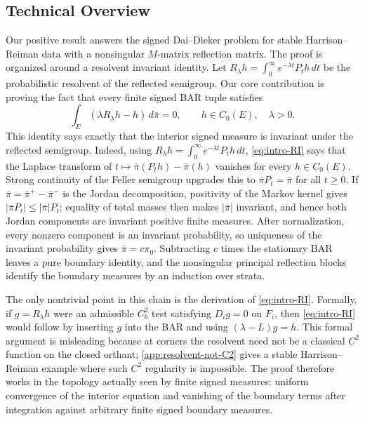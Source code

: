 \documentclass[aihp]{imsart}
\numberwithin{equation}{section}
\theoremstyle{plain}
\theoremstyle{definition}
\newcommand{\1}{\mathbf 1}
\begin{document}
\subsection*{Technical Overview}

Our positive result answers the signed Dai--Dieker problem for stable Harrison--Reiman data with a nonsingular $M$-matrix reflection matrix.  The proof is organized around a resolvent invariant identity.  Let $R_\lambda h=\int_0^\infty e^{-\lambda t}P_t h\,dt$ be the probabilistic resolvent of the reflected semigroup.  Our core contribution is proving the fact that every finite signed BAR tuple satisfies
\begin{equation}\label{eq:intro-RI}
\tag{RI}
 \int_E(\lambda R_\lambda h-h)\,d\bar\pi=0,
 \qquad h\in C_0(E),\quad \lambda>0.
\end{equation}
This identity says exactly that the interior signed measure is invariant under the reflected semigroup.  Indeed, using $R_\lambda h=\int_0^\infty e^{-\lambda t}P_th\,dt$, \eqref{eq:intro-RI} says that the Laplace transform of $t\mapsto\bar\pi(P_th)-\bar\pi(h)$ vanishes for every $h\in C_0(E)$.  Strong continuity of the Feller semigroup upgrades this to $\bar\pi P_t=\bar\pi$ for all $t\ge0$.  If $\bar\pi=\bar\pi^+-\bar\pi^-$ is the Jordan decomposition, positivity of the Markov kernel gives $|\bar\pi P_t|\le |\bar\pi|P_t$; equality of total masses then makes $|\bar\pi|$ invariant, and hence both Jordan components are invariant positive finite measures.  After normalization, every nonzero component is an invariant probability, so uniqueness of the invariant probability gives $\bar\pi=c\pi_0$.  Subtracting $c$ times the stationary BAR leaves a pure boundary identity, and the nonsingular principal reflection blocks identify the boundary measures by an induction over strata.

The only nontrivial point in this chain is the derivation of \eqref{eq:intro-RI}.  Formally, if $g=R_\lambda h$ were an admissible $C_b^2$ test satisfying $D_i g=0$ on $F_i$, then \eqref{eq:intro-RI} would follow by inserting $g$ into the BAR and using $(\lambda-L)g=h$.  This formal argument is misleading because at corners the resolvent need not be a classical $C^2$ function on the closed orthant; \cref{app:resolvent-not-C2} gives a stable Harrison--Reiman example where such $C^2$ regularity is impossible.  The proof therefore works in the topology actually seen by finite signed measures: uniform convergence of the interior equation and vanishing of the boundary terms after integration against arbitrary finite signed boundary measures.
\end{document}
